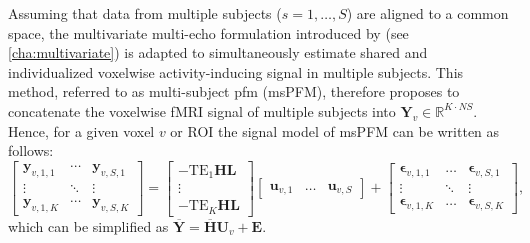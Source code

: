 Assuming that data from multiple subjects ($s=1,\ldots,S$) are aligned to a
common space, the multivariate multi-echo formulation introduced by
\citep{Urunuela2022Wholebrainmultivariate} (see \cref{cha:multivariate}) is
adapted to simultaneously estimate shared and individualized voxelwise
activity-inducing signal in multiple subjects. This method, referred to as
multi-subject \acrlong*{pfm} (msPFM), therefore proposes to concatenate the
voxelwise fMRI signal of multiple subjects into $\mathbf{Y}_v \in \mathbb{R}^{K
\cdot N S}$. Hence, for a given voxel $v$ or ROI the signal model of msPFM can
be written as follows:
\begin{equation}
\label{eq:signal_model_multi_subject}
\left[\begin{array}{ccc} \mathbf{y}_{v,1,1} & \cdots & \mathbf{y}_{v,S,1} \\
    \vdots & \ddots & \vdots \\
    \mathbf{y}_{v,1,K} & \cdots & \mathbf{y}_{v,S,K}
\end{array}\right]
=
\left[\begin{array}{c} -\mathrm{TE}_{1} \mathbf{HL} \\
    \vdots \\
    -\mathrm{TE}_{K} \mathbf{HL}
\end{array}\right]
\left[\begin{array}{ccc}
    \mathbf{u}_{v,1} & \dots & \mathbf{u}_{v,S}
\end{array}\right]
+
\left[\begin{array}{ccc} \boldsymbol{\epsilon}_{v,1,1} & \dots & \boldsymbol{\epsilon}_{v,S,1} \\
    \vdots & \ddots & \vdots \\
    \boldsymbol{\epsilon}_{v,1,K} & \dots & \boldsymbol{\epsilon}_{v,S,K}
\end{array}\right],
\end{equation}
which can be simplified as
$\overline{\mathbf{Y}}=\overline{\mathbf{H}}\mathbf{U}_v + \mathbf{E}$.
